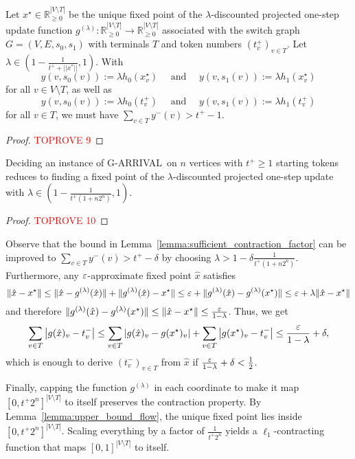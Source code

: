 \documentclass[a4paper,UKenglish,cleveref, autoref, thm-restate]{lipics-v2021}
\newcommand{\R}{\mathbb{R}}
\DeclarePairedDelimiter\norm{\lVert}{\rVert}
\renewcommand{\epsilon}{\ensuremath\varepsilon}
\newcommand{\problem}[1]{\textrm{#1}}
\newcommand{\garrival}{\problem{G-ARRIVAL}}
\begin{document}
\begin{lemma}
\label{lemma:sufficient_contraction_factor}    
    Let $x^\star \in \R^{|V \setminus T|}_{\geq 0}$ be the unique fixed point of the $\lambda$-discounted projected one-step update function $g^{(\lambda)} : \R^{|V \setminus T|}_{\geq 0} \rightarrow \R^{|V \setminus T|}_{\geq 0}$ associated with the switch graph $G = (V, E, s_0, s_1)$ with terminals $T$ and token numbers $(t^+_v)_{v \in T}$. Let $\lambda \in (1 - \frac{1}{t^+ + ||x^*||}, 1)$.  With 
    \[
        y(v, s_0(v)) := \lambda h_0(x^\star_v) \quad \text{ and } \quad y(v, s_1(v)) := \lambda h_1(x^\star_v) 
    \]
    for all $v \in V \setminus T$, as well as 
    \[
        y(v, s_0(v)) := \lambda h_0(t^+_v) \quad \text{ and } \quad 
        y(v, s_1(v)) := \lambda h_1(t^+_v)
    \]
    for all $v \in T$, we must have $\sum_{v \in T} y^-(v) > t^+ - 1.$
    \end{lemma}
\begin{proof}\textcolor{red}{TOPROVE 9}\end{proof}

\begin{theorem}
    Deciding an instance of \garrival\ on $n$ vertices with $t^+ \geq 1$ starting tokens reduces to finding a fixed point of the $\lambda$-discounted projected one-step update with $\lambda \in (1 - \frac{1}{t^+ (1 + n 2^{n})}, 1)$.
\end{theorem}
\begin{proof}\textcolor{red}{TOPROVE 10}\end{proof}

Observe that the bound in Lemma~\ref{lemma:sufficient_contraction_factor} can be improved to $\sum_{v \in T} y^-(v) > t^+ - \delta$ by choosing $\lambda > 1 - \delta \frac{1}{t^+ (1 + n2^n)}$. Furthermore, any $\epsilon$-approximate fixed point 
$\hat{x}$ satisfies 
\[
    \norm{\hat{x} - x^\star} 
    \leq \norm{\hat{x} - g^{(\lambda)}(\hat{x})} + \norm{g^{(\lambda)}(\hat{x}) - x^\star} 
    \leq \epsilon + \norm{g^{(\lambda)}(\hat{x}) - g^{(\lambda)}(x^\star)} 
    \leq \epsilon + \lambda \norm{\hat{x} - x^\star}
\]
and therefore $\norm{g^{(\lambda)}(\hat{x}) - g^{(\lambda)}(x^\star)}  \leq \norm{\hat{x} - x^\star} \leq \frac{\epsilon}{1 - \lambda}$. Thus, we get 
\[
    \sum_{v \in T} \left| g(\hat{x})_v - t^-_v \right| \leq \sum_{v \in T} \left| g(\hat{x})_v - g(x^\star)_v \right| + \sum_{v \in T} \left| g(x^\star)_v - t^-_v \right| \leq \frac{\epsilon}{1 - \lambda} + \delta,
\]
which is enough to derive $(t^-_v)_{v \in T}$ from $\hat{x}$ if $\frac{\epsilon}{1 - \lambda} + \delta < \frac{1}{2}$.

Finally, capping the function $g^{(\lambda)}$ in each coordinate to make it map $[0, t^+ 2^{n}]^{|V\setminus T|}$ to itself preserves the contraction property. By Lemma~\ref{lemma:upper_bound_flow}, the unique fixed point lies inside $[0, t^+ 2^{n}]^{|V\setminus T|}$. Scaling everything by a factor of $\frac{1}{t^+ 2^{n}}$ yields a $\ell_1$-contracting function that maps $[0, 1]^{|V \setminus T|}$ to itself.


\end{document}
